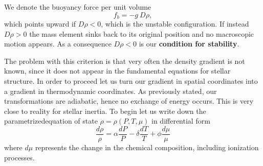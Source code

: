 We denote the buoyancy force per unit volume 
$$
f_b=- g \ D \rho,
$$
which points upward if $D \rho < 0$, which is the unstable configuration. If instead $D \rho > 0$ the mass element sinks back to its original position and no macroscopic motion appears. As a consequence $D \rho<0$ is our \textbf{condition for stability}.

The problem with this criterion is that very often the density gradient is not known, since it does not appear in the fundamental equations for stellar structure. In order to proceed let us turn our gradient in spatial coordinates into a gradient in thermodynamic coordinates. As previously stated, our transformations are adiabatic, hence no exchange of energy occurs. This is very close to reality for stellar inertia. To begin let us write down the parametrizedequation of state $\rho = \rho (P, T, \mu)$ in differential form
\begin{equation}\label{eq:EoSdiff}
	\frac{d \rho}{\rho} = \alpha \frac{d P}{P} - \delta \frac{d T}{T} + \phi \frac{d \mu}{\mu}
\end{equation}
where $d \mu$ represents the change in the chemical composition, including ionization processes. 

